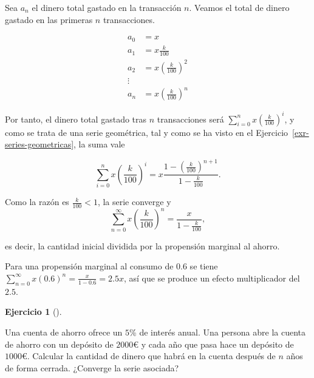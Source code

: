 \documentclass[
  spanish,
  a4paper,
]{scrreport}
\theoremstyle{definition}
\newtheorem{exercise}{Ejercicio}[chapter]
\theoremstyle{remark}
\begin{document}
\begin{tcolorbox}[enhanced jigsaw, arc=.35mm, bottomrule=.15mm, bottomtitle=1mm, breakable, colback=white, colbacktitle=quarto-callout-tip-color!10!white, colframe=quarto-callout-tip-color-frame, coltitle=black, left=2mm, leftrule=.75mm, opacityback=0, opacitybacktitle=0.6, rightrule=.15mm, title=\textcolor{quarto-callout-tip-color}{\faLightbulb}\hspace{0.5em}{Solución}, titlerule=0mm, toprule=.15mm, toptitle=1mm]

Sea \(a_n\) el dinero total gastado en la transacción \(n\). Veamos el
total de dinero gastado en las primeras \(n\) transacciones.

\begin{align*}
a_0 &=  x\\
a_1 &= x\frac{k}{100}\\
a_2 &= x\left(\frac{k}{100}\right)^2\\
\vdots\\
a_n &= x\left(\frac{k}{100}\right)^n
\end{align*}

Por tanto, el dinero total gastado tras \(n\) transacciones será
\(\sum_{i=0}^n x\left(\frac{k}{100}\right)^i\), y como se trata de una
serie geométrica, tal y como se ha visto en el
Ejercicio~\ref{exr-series-geometricas}, la suma vale

\[
\sum_{i=0}^n x\left(\frac{k}{100}\right)^i = x\frac{1-\left(\frac{k}{100}\right)^{n+1}}{1-\frac{k}{100}}.
\]

Como la razón es \(\frac{k}{100}<1\), la serie converge y \[
\sum_{n=0}^\infty x\left(\frac{k}{100}\right)^n = \frac{x}{1-\frac{k}{100}},
\]

es decir, la cantidad inicial dividida por la propensión marginal al
ahorro.

Para una propensión marginal al consumo de \(0.6\) se tiene
\(\sum_{n=0}^\infty x\left(0.6\right)^n = \frac{x}{1-0.6} = 2.5x\), así
que se produce un efecto multiplicador del \(2.5\).

\end{tcolorbox}

\begin{exercise}[]\protect\hypertarget{exr-cuenta-ahorro}{}\label{exr-cuenta-ahorro}

Una cuenta de ahorro ofrece un \(5\)\% de interés anual. Una persona
abre la cuenta de ahorro con un depósito de \(2000\)€ y cada año que
pasa hace un depósito de \(1000\)€. Calcular la cantidad de dinero que
habrá en la cuenta después de \(n\) años de forma cerrada. ¿Converge la
serie asociada?

\end{exercise}
\end{document}
